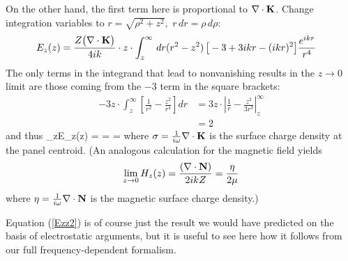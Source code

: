 \documentclass[letterpaper]{article}
\begin{document}
On the other hand, the first term here is proportional to $\nabla \cdot \mathbf{K}$.
Change integration variables to 
$r=\sqrt{\rho^2 + z^2}, \,\, r\,dr = \rho\, d\rho:$
\begin{align*}
 E_z(z) 
&= \frac{Z \big (\nabla \cdot \mathbf{K} \big)}{4ik} 
   \cdot z \cdot \int_z^\infty \, dr (r^2 - z^2) \, \big[-3 + 3ikr - (ikr)^2\big] 
   \frac{e^{ikr}}{r^4}
\end{align*}
The only terms in the integrand that lead to nonvanishing results in the 
$z\to 0$ limit are those coming from the $-3$ term in the square brackets:
\begin{align*}
 -3z\cdot \int_z^\infty \left[ \frac{1}{r^2} - \frac{z^2}{r^4} \right]dr 
&=
  3z\cdot\left| \frac{1}{r} - \frac{z^2}{3r^3} \right|_{z}^\infty
\\
&=2
\end{align*}
and thus 
{
   \lim_{z}E_z(z) 
   =  
   =  
   = \frac{\sigma}{2\epsilon}
}
where $\sigma=\frac{1}{i\omega}\nabla \cdot \mathbf{K}$ is 
the surface charge density at the panel centroid. 
(An analogous calculation for the magnetic field yields
$$ \lim_{z\to 0}H_z(z) 
   = \frac{(\nabla \cdot \mathbf{N})}{2ik Z} 
   = \frac{\eta}{2\mu}
$$
where $\eta=\frac{1}{i\omega}\nabla \cdot \mathbf{N}$ is 
the magnetic surface charge density.)

Equation (\ref{Ezz2}) is of course just the result we 
would have predicted on the basis of electrostatic 
arguments, but it is useful to see here how it follows 
from our full frequency-dependent formalism.

\appendix

 
 
 
\end{document}
